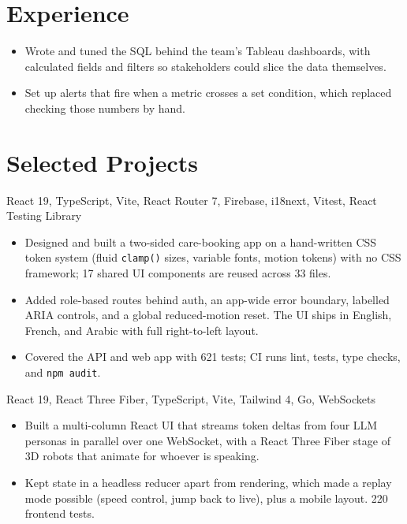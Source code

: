 \documentclass[10pt, a4paper]{article}
\begin{document}
\section{Experience}

\begin{itemize}
  \item Wrote and tuned the SQL behind the team's Tableau dashboards, with
        calculated fields and filters so stakeholders could slice the data
        themselves.
  \item Set up alerts that fire when a metric crosses a set condition, which
        replaced checking those numbers by hand.
\end{itemize}

\section{Selected Projects}

%
  {React 19, TypeScript, Vite, React Router 7, Firebase, i18next, Vitest, React Testing Library}
\begin{itemize}
  \item Designed and built a two-sided care-booking app on a hand-written CSS
        token system (fluid \texttt{clamp()} sizes, variable fonts, motion
        tokens) with no CSS framework; 17 shared UI components are reused
        across 33 files.
  \item Added role-based routes behind auth, an app-wide error boundary,
        labelled ARIA controls, and a global reduced-motion reset. The UI ships
        in English, French, and Arabic with full right-to-left layout.
  \item Covered the API and web app with 621 tests; CI runs lint, tests, type
        checks, and \texttt{npm audit}.
\end{itemize}

\vspace{3pt}

%
  {React 19, React Three Fiber, TypeScript, Vite, Tailwind 4, Go, WebSockets}
\begin{itemize}
  \item Built a multi-column React UI that streams token deltas from four LLM
        personas in parallel over one WebSocket, with a React Three Fiber stage
        of 3D robots that animate for whoever is speaking.
  \item Kept state in a headless reducer apart from rendering, which made a
        replay mode possible (speed control, jump back to live), plus a mobile
        layout. 220 frontend tests.
\end{itemize}
\end{document}
